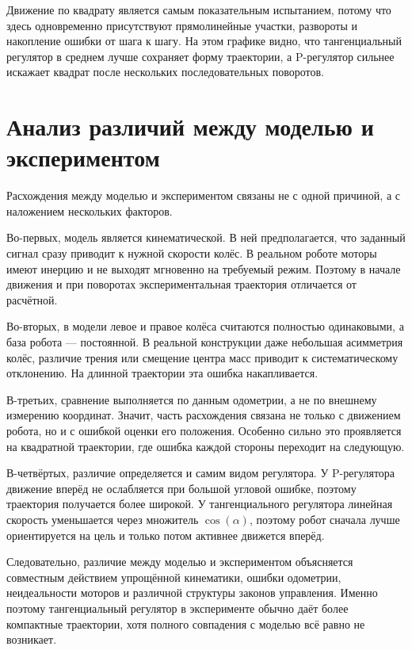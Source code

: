 \documentclass[a4paper, 12pt]{article}
\begin{document}
Движение по квадрату является самым показательным испытанием, потому что здесь одновременно присутствуют прямолинейные участки, развороты и накопление ошибки от шага к шагу. На этом графике видно, что тангенциальный регулятор в среднем лучше сохраняет форму траектории, а P-регулятор сильнее искажает квадрат после нескольких последовательных поворотов.

\section{Анализ различий между моделью и экспериментом}

Расхождения между моделью и экспериментом связаны не с одной причиной, а с наложением нескольких факторов.

Во-первых, модель является кинематической. В ней предполагается, что заданный сигнал сразу приводит к нужной скорости колёс. В реальном роботе моторы имеют инерцию и не выходят мгновенно на требуемый режим. Поэтому в начале движения и при поворотах экспериментальная траектория отличается от расчётной.

Во-вторых, в модели левое и правое колёса считаются полностью одинаковыми, а база робота --- постоянной. В реальной конструкции даже небольшая асимметрия колёс, различие трения или смещение центра масс приводит к систематическому отклонению. На длинной траектории эта ошибка накапливается.

В-третьих, сравнение выполняется по данным одометрии, а не по внешнему измерению координат. Значит, часть расхождения связана не только с движением робота, но и с ошибкой оценки его положения. Особенно сильно это проявляется на квадратной траектории, где ошибка каждой стороны переходит на следующую.

В-четвёртых, различие определяется и самим видом регулятора. У P-регулятора движение вперёд не ослабляется при большой угловой ошибке, поэтому траектория получается более широкой. У тангенциального регулятора линейная скорость уменьшается через множитель $\cos(\alpha)$, поэтому робот сначала лучше ориентируется на цель и только потом активнее движется вперёд.

Следовательно, различие между моделью и экспериментом объясняется совместным действием упрощённой кинематики, ошибки одометрии, неидеальности моторов и различной структуры законов управления. Именно поэтому тангенциальный регулятор в эксперименте обычно даёт более компактные траектории, хотя полного совпадения с моделью всё равно не возникает.
\end{document}
